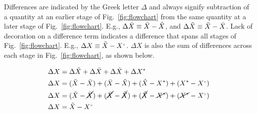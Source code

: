 Differences are indicated by the Greek letter $\Delta$ and always
signify subtraction of a quantity at an earlier stage of Fig.~\ref{fig:flowchart}
from the same quantity at a later stage of Fig.~\ref{fig:flowchart}.
E.g.,
$\Delta \bar{X} \equiv \bar{X} - \hat{X}$, and
$\Delta \tilde{X} \equiv \tilde{X} - \bar{X}$.
Lack of decoration on a difference term indicates a difference that spans all stages of Fig.~\ref{fig:flowchart}.
E.g., $\Delta X \equiv \tilde{X} - {}{X}^{\scriptscriptstyle \circ}$.
$\Delta X$ is also the sum of differences across each stage in Fig.~\ref{fig:flowchart},
as shown below.

\begin{align}
\Delta X &= \Delta \tilde{X} + \Delta \bar{X} + \Delta \hat{X} + \Delta {X}^* \nonumber \\
\Delta X &= (\tilde{X} - \bar{X}) + (\bar{X} - \hat{X})
            + (\hat{X} - {X}^*) + ({X}^* - {}{X}^{\scriptscriptstyle \circ}) \nonumber \\
\Delta X &= (\tilde{X} - \cancel{\bar{X}}) + (\cancel{\bar{X}} - \cancel{\hat{X}})
            + (\cancel{\hat{X}} - \cancel{{X}^*}) + (\cancel{{X}^*} - {}{X}^{\scriptscriptstyle \circ}) \nonumber \\
\Delta X &= \tilde{X} - {}{X}^{\scriptscriptstyle \circ}
\end{align}
